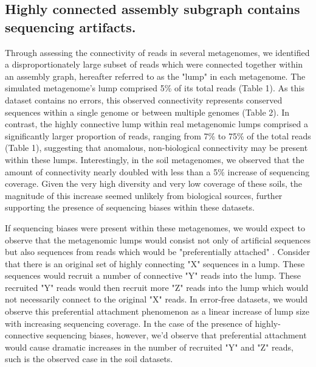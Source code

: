 \documentclass[11pt]{article} %
\begin{document}
\subsection{Highly connected assembly subgraph contains sequencing artifacts.}

Through assessing the connectivity of reads in several metagenomes, we identified a disproportionately large subset of reads which were connected together within an assembly graph, hereafter referred to as the "lump" in each metagenome.  The simulated metagenome's lump comprised 5\% of its total reads (Table 1).  As this dataset contains no errors, this observed connectivity represents conserved sequences within a single genome or between multiple genomes (Table 2).  In contrast, the highly connective lump within real metagenomic lumps comprised a significantly larger proportion of reads, ranging from 7\% to 75\% of the total reads (Table 1), suggesting that anomalous, non-biological connectivity may be present within these lumps.  Interestingly, in the soil metagenomes, we observed that the amount of connectivity nearly doubled with less than a 5\% increase of sequencing coverage.  Given the very high diversity and very low coverage of these soils, the magnitude of this increase seemed unlikely from biological sources, further supporting the presence of sequencing biases within these datasets. 

If sequencing biases were present within these metagenomes, we would expect to observe that the metagenomic lumps would consist not only of artificial sequences but also sequences from reads which would be "preferentially attached" \cite{Barabasi:1999p1083}.  Consider that there is an original set of highly connecting "X" sequences in a lump.  These sequences would recruit a number of connective "Y" reads into the lump.  These recruited "Y" reads would then recruit more "Z" reads into the lump which would not necessarily connect to the original "X" reads.  In error-free datasets, we would observe this preferential attachment phenomenon as a linear increase of lump size with increasing sequencing coverage.  In the case of the presence of highly-connective sequencing biases, however, we'd observe that preferential attachment would cause dramatic increases in the number of recruited "Y" and "Z" reads, such is the observed case in the soil datasets.   
\end{document}
